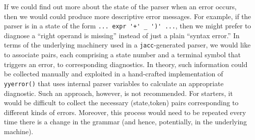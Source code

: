 \documentclass[12pt]{article}
\def\jacc{{\tt jacc}}
\begin{document}
If we could find out more about the state of the parser when an
error occurs, then we would could produce more descriptive error
messages.  For example, if the parser is in a state of the form
\verb"... expr '+' _ ')' ...", then we might prefer to diagnose
a ``right operand is missing'' instead of just a plain ``syntax error.''
In terms of the underlying machinery used in a \jacc-generated parser,
we would like to associate pairs, each comprising a state number and a
terminal symbol that triggers an error, to corresponding diagnostics.
In theory, such information could be collected manually and exploited
in a hand-crafted implementation of \verb"yyerror()" that uses
internal parser variables to calculate an appropriate diagnostic.
Such an approach, however, is not recommended.  For starters, it
would be difficult to collect the necessary (state,token) pairs
corresponding to different kinds of errors.  Moreover, this process
would need to be repeated every time there is a change in the grammar
(and hence, potentially, in the underlying machine).
\end{document}
